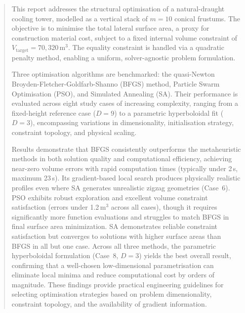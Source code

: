 \begin{abstract}

This report addresses the structural optimisation of a natural-draught cooling tower, modelled as a vertical stack of $m = 10$ conical frustums. 
The objective is to minimise the total lateral surface area, a proxy for construction material cost, 
subject to a fixed internal volume constraint of $V_{\text{target}} = 70{,}320\,\text{m}^3$. 
The equality constraint is handled via a quadratic penalty method, enabling a uniform, solver-agnostic problem formulation.

Three optimisation algorithms are benchmarked: the quasi-Newton Broyden-Fletcher-Goldfarb-Shanno (BFGS) method, 
Particle Swarm Optimisation (PSO), and Simulated Annealing (SA). 
Their performance is evaluated across eight study cases of increasing complexity, ranging from a fixed-height reference case ($D = 9$) 
to a parametric hyperboloidal fit ($D = 3$), 
encompassing variations in dimensionality, initialisation strategy, constraint topology, and physical scaling.

Results demonstrate that BFGS consistently outperforms the metaheuristic methods in both solution quality and computational efficiency, achieving near-zero volume errors with rapid computation times (typically under 2\,s, maximum 23\,s). 
Its gradient-based local search produces physically realistic profiles even where SA generates unrealistic zigzag geometries (Case~6). 
PSO exhibits robust exploration and excellent volume constraint satisfaction (errors under 1.2\,m$^3$ across all cases), though it requires significantly more function evaluations and struggles to match BFGS in final surface area minimization. 
SA demonstrates reliable constraint satisfaction but converges to solutions with higher surface areas than BFGS in all but one case. 
Across all three methods, the parametric hyperboloidal formulation (Case~8, $D = 3$) yields the best overall result, confirming that a well-chosen low-dimensional parametrisation can eliminate local minima and reduce computational cost by orders of magnitude. 
These findings provide practical engineering guidelines for selecting optimisation strategies based on problem dimensionality, constraint topology, and the availability of gradient information.
\end{abstract}
